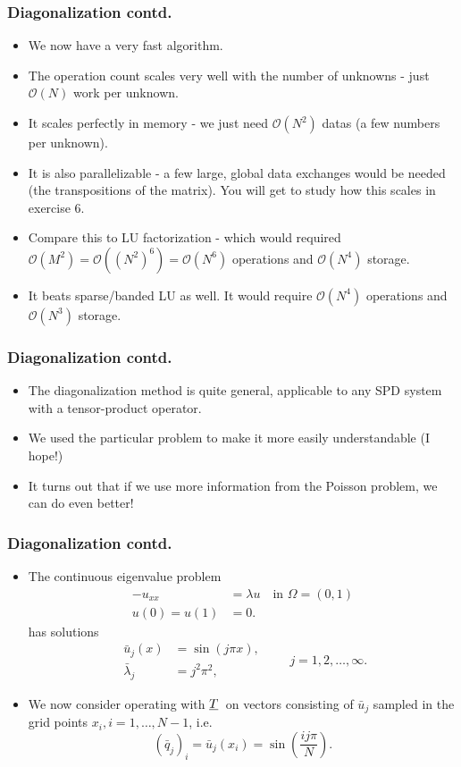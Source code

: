 \documentclass{beamer}
\newcommand{\ub}[1]{\underbar{$#1$}\,}
\begin{document}
\begin{frame}\frametitle{Diagonalization contd.}
  \begin{itemize}
    \item We now have a very fast algorithm.
    \item The operation count scales very well with the number of unknowns - just $\mathcal{O}\left(N\right)$ work per unknown.
    \item It scales perfectly in memory - we just need $\mathcal{O}\left(N^2\right)$ datas (a few numbers per unknown).
    \item It is also parallelizable - a few large, global data exchanges would be needed
      (the transpositions of the matrix). You will get to study how this scales in exercise 6.
    \item Compare this to LU factorization - which would required
      $\mathcal{O}\left(M^2\right) = \mathcal{O}\left((N^2)^6\right) = \mathcal{O}\left(N^6\right)$ operations
      and
      $\mathcal{O}\left(N^4\right)$ storage.
    \item It beats sparse/banded LU as well. It would require
      $\mathcal{O}\left(N^4\right)$ operations and $\mathcal{O}\left(N^3\right)$ storage.
  \end{itemize}
\end{frame}
\begin{frame}\frametitle{Diagonalization contd.}
  \begin{itemize}
    \item The diagonalization method is quite general, applicable to any SPD system with
      a tensor-product operator.
    \item We used the particular problem to make it more easily understandable (I hope!)
    \item It turns out that if we use more information from the Poisson problem,
      we can do even better!
  \end{itemize}
\end{frame}
\begin{frame}\frametitle{Diagonalization contd.}
  \begin{itemize}
    \item The continuous eigenvalue problem
      \[
        \begin{split}
              -u_{xx} &= \lambda u \quad \text{in } \Omega=(0,1)\\
          u(0) = u(1) &= 0.
        \end{split}
      \]
      has solutions
      \[
         \begin{split}
            \bar{u}_j(x) &= \sin(j \pi x), \\
            \bar{\lambda}_j &= j^2 \pi^2,
         \end{split}
         \qquad j=1,2,\ldots,\infty.
      \]
    \item We now consider operating with $\ub{T}$ on vectors consisting of $\bar{u}_j$
      sampled in the grid points $x_i, i=1,\ldots,N-1$, i.e.
      \[
        \left(\bar{q}_j\right)_i = \bar{u}_j\left(x_i\right) = \sin\left(\frac{ij\pi}{N}\right).
      \]
  \end{itemize}
\end{frame}
\end{document}
